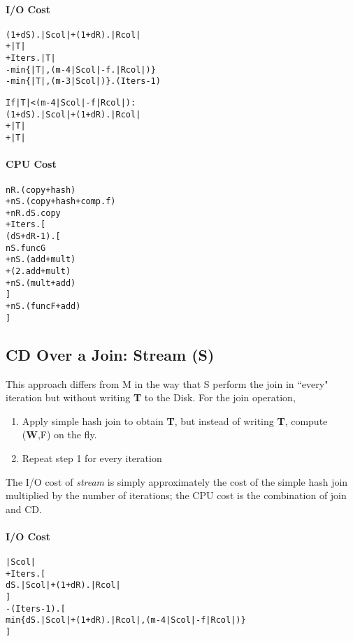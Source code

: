 \documentclass{vldb}
\begin{document}
\paragraph*{I/O Cost}
\begin{alltt} 
  (1+dS).|Scol|+(1+dR).|Rcol|     
+ |T|                                            
+ Iters.|T|                                    
- min\{|T|, (m-4|Scol|-f.|Rcol|)\}
- min\{|T|,(m-3|Scol|)\}.(Iters-1)   

If |T| < (m-4|Scol|-f|Rcol|):
  (1+dS).|Scol|+(1+dR).|Rcol| 
+ |T|                              
+ |T|                              
\end{alltt}

\paragraph*{CPU Cost}
\begin{alltt}
  nR.(copy+hash)         
+ nS.(copy+hash+comp.f)  
+ nR.dS.copy           
+ Iters.[         
   (dS+dR-1).[      
    	 nS.funcG   
    + nS.(add+mult)
    + (2.add+mult)
    + nS.(mult+add)   
   ]  
   + nS.(funcF+add)  
  ]    
\end{alltt}  

\subsection{CD Over a Join: Stream (S)}
This approach differs from M in the way that S perform the join in ``every" iteration but without writing \textbf{T} to the Disk. For the join operation,

\begin{enumerate}
\item Apply simple hash join to obtain \textbf{T}, but instead of writing \textbf{T}, compute (\textbf{W},F) on the fly.
\item Repeat step 1 for every iteration
\end{enumerate}

\noindent
The I/O cost of \textit{stream} is simply approximately the cost of the simple hash join multiplied by the number of iterations; the CPU cost is the combination of join and CD. 

\paragraph*{I/O Cost}
\begin{alltt} 
  |Scol| 
+ Iters.[
     dS.|Scol|+(1+dR).|Rcol|     
 ]
- (Iters-1).[                        
     min\{dS.|Scol|+(1+dR).|Rcol|,(m-4|Scol|-f|Rcol|)\}
  ]
  
\end{alltt}
\end{document}
